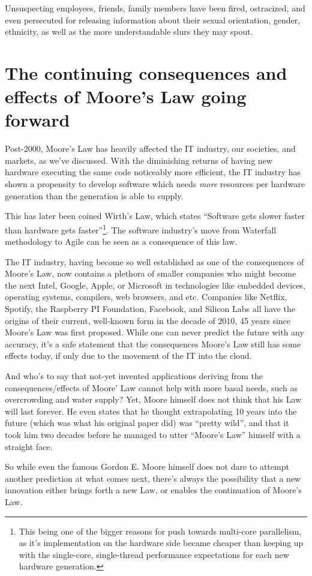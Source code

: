\documentclass[a4paper,12pt]{article}
\begin{document}
Unsuspecting employees, friends, family members have been fired, ostracized, and even persecuted for releasing information about their sexual orientation, gender, ethnicity, as well as the more understandable slurs they may spout.

\section*{The continuing consequences and effects of Moore's Law going forward}

Post-2000, Moore's Law has heavily affected the IT industry, our societies, and markets, as we've discussed.
With the diminishing returns of having new hardware executing the same code noticeably more efficient, the IT industry has shown a propensity to develop software which needs \emph{more} resources per hardware generation than the generation is able to supply.

This has later been coined Wirth's Law\cite{TheGreatMoore'sLawCompensator}, which states ``Software gets slower faster than hardware gets faster''\footnote{This being one of the bigger reasons for push towards multi-core parallelism, as it's implementation on the hardware side became cheaper than keeping up with the single-core, single-thread performance expectations for each new hardware generation.}.
The software industry's move from Waterfall methodology to Agile can be seen as a consequence of this law.

The IT industry, having become so well established as one of the consequences of Moore's Law, now contains a plethora of smaller companies who might become the next Intel, Google, Apple, or Microsoft in technologies like embedded devices, operating systems, compilers, web browsers, and etc.
Companies like Netflix, Spotify, the Raspberry PI Foundation, Facebook, and Silicon Labs all have the origins of their current, well-known form in the decade of 2010, 45 years since Moore's Law was first proposed.
While one can never predict the future with any accuracy, it's a safe statement that the consequences Moore's Law still has some effects today, if only due to the movement of the IT into the cloud\cite{Moore'sLawCloudPricing}.

And who's to say that not-yet invented applications deriving from the consequences/effects of Moore' Law cannot help with more basal needs\cite{Moore'sLawTurns50}, such as overcrowding and water supply?
Yet, Moore himself\cite{MooreSpeculates} does not think that his Law will last forever.
He even states that he thought extrapolating 10 years into the future (which was what his original paper did) was ``pretty wild'', and that it took him two decades before he managed to utter ``Moore's Law'' himself with a straight face.

So while even the famous Gordon E. Moore himself does not dare to attempt another prediction at what comes next, there's always the possibility that a new innovation either brings forth a new Law, or enables the continuation of Moore's Law\cite{FutureForTransistor}.



\end{document}
